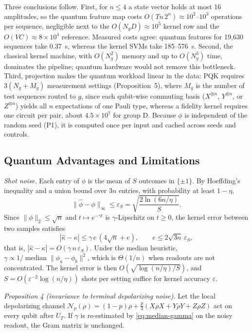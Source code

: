 \documentclass[conference]{IEEEtran}
\begin{document}
Three conclusions follow. First, for $n\le4$ a state vector holds at most 16 amplitudes, so the quantum feature map costs $O(Tn\,2^n)\approx10^2$--$10^3$ operations per sequence, negligible next to the $O(N_gD)\approx10^5$ kernel row and the $O(VC)\approx8\times10^4$ reference. Measured costs agree: quantum features for 19,630 sequences take 0.37~s, whereas the kernel SVMs take 185--576~s. Second, the classical kernel machine, with $O(N_g^2)$ memory and up to $O(N_g^3)$ time, dominates the pipeline; quantum hardware would not remove this bottleneck. Third, projection makes the quantum workload linear in the data: PQK requires $3(N_g+M_g)$ measurement settings (Proposition~5), where $M_g$ is the number of test sequences routed to $g$, since each qubit-wise commuting basis ($X^{\otimes n}$, $Y^{\otimes n}$, or $Z^{\otimes n}$) yields all $n$ expectations of one Pauli type, whereas a fidelity kernel requires one circuit per pair, about $4.5\times10^7$ for group D. Because $\phi$ is independent of the random seed (P1), it is computed once per input and cached across seeds and controls.

\subsection{Quantum Advantages and Limitations}
\label{sec:quantum-tradeoffs}

\textit{Shot noise.} Each entry of $\phi$ is the mean of $S$ outcomes in $\{\pm1\}$. By Hoeffding's inequality and a union bound over $3n$ entries, with probability at least $1-\eta$,
\begin{equation}
    \|\hat{\phi}-\phi\|_\infty\le\varepsilon_S=\sqrt{\frac{2\ln(6n/\eta)}{S}}.
\end{equation}
Since $\|\phi\|_2\le\sqrt{n}$ and $t\mapsto e^{-\gamma t}$ is $\gamma$-Lipschitz on $t\ge0$, the kernel error between two samples satisfies
\begin{equation}
    |\hat{\kappa}-\kappa|\le\gamma\,e\,(4\sqrt{n}+e),\qquad e\le2\sqrt{3n}\,\varepsilon_S,
\end{equation}
that is, $|\hat{\kappa}-\kappa|=O(\gamma\,n\,\varepsilon_S)$. Under the median heuristic, $\gamma\propto1/\operatorname{median}\|\phi_a-\phi_b\|^2$, which is $\Theta(1/n)$ when readouts are not concentrated. The kernel error is then $O(\sqrt{\log(n/\eta)/S})$, and $S=O(\varepsilon^{-2}\log(n/\eta))$ shots per setting suffice for kernel accuracy $\varepsilon$.

\textit{Proposition 4 (invariance to terminal depolarizing noise).} Let the local depolarizing channel $\mathcal{N}_p(\rho)=(1-p)\rho+\tfrac{p}{3}(X\rho X+Y\rho Y+Z\rho Z)$ act on every qubit after $U_T$. If $\gamma$ is re-estimated by \eqref{eq:median-gamma} on the noisy readout, the Gram matrix is unchanged.
\end{document}
